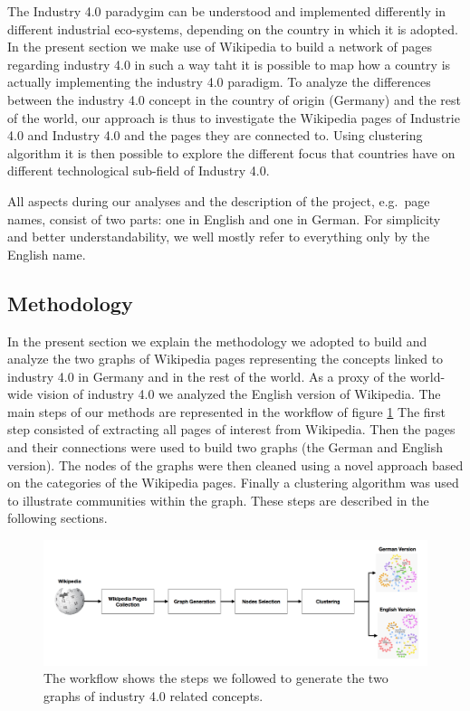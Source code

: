 \documentclass[]{book}
\begin{document}
The Industry 4.0 paradygim can be understood and implemented differently
in different industrial eco-systems, depending on the country in which
it is adopted. In the present section we make use of Wikipedia to build
a network of pages regarding industry 4.0 in such a way taht it is
possible to map how a country is actually implementing the industry 4.0
paradigm. To analyze the differences between the industry 4.0 concept in
the country of origin (Germany) and the rest of the world, our approach
is thus to investigate the Wikipedia pages of Industrie 4.0 and Industry
4.0 and the pages they are connected to. Using clustering algorithm it
is then possible to explore the different focus that countries have on
different technological sub-field of Industry 4.0.

All aspects during our analyses and the description of the project,
e.g.~page names, consist of two parts: one in English and one in German.
For simplicity and better understandability, we well mostly refer to
everything only by the English name.

\subsection{Methodology}\label{methodology-7}

In the present section we explain the methodology we adopted to build
and analyze the two graphs of Wikipedia pages representing the concepts
linked to industry 4.0 in Germany and in the rest of the world. As a
proxy of the world-wide vision of industry 4.0 we analyzed the English
version of Wikipedia. The main steps of our methods are represented in
the workflow of figure \ref{fig:industriewf} The first step consisted of
extracting all pages of interest from Wikipedia. Then the pages and
their connections were used to build two graphs (the German and English
version). The nodes of the graphs were then cleaned using a novel
approach based on the categories of the Wikipedia pages. Finally a
clustering algorithm was used to illustrate communities within the
graph. These steps are described in the following sections.

\begin{figure}

{\centering \includegraphics[width=1\linewidth]{_bookdown_files/figures/industrie_wf} 

}

\caption{The workflow shows the steps we followed to generate the two graphs of industry 4.0 related concepts.}\label{fig:industriewf}
\end{figure}
\end{document}

